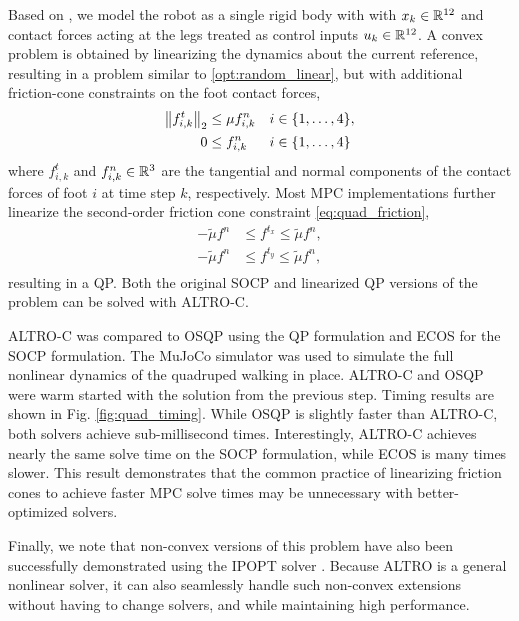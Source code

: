 \documentclass[../root.tex]{subfiles}
\begin{document}
Based on \cite{carlo_Dynamic_2018}, we model the robot as a single rigid body with
with $x_k \in \mathbb{R}^{12}$ and contact forces acting at the legs treated as
control inputs $u_k \in \mathbb{R}^{12}$.
A convex problem is obtained by linearizing the dynamics about the current
reference, resulting in a problem similar to \eqref{opt:random_linear}, but
with additional friction-cone constraints on the foot contact forces,
\begin{subequations}
\begin{align}
    \norm{f_{i,k}^t}_2 &\leq \mu f_{i,k}^n  && i \in \{1,\hdots,4\} ,\label{eq:quad_friction} \\
    0 &\leq f_{i,k}^n && i \in \{1, \hdots, 4\}
\end{align}
\end{subequations}
where $f_{i,k}^t$ and $f_{i,k}^n \in \mathbb{R}^{3}$ are the tangential and normal
components of the contact forces of foot $i$ at time step $k$, respectively.
Most MPC implementations further linearize the second-order friction cone
constraint \eqref{eq:quad_friction},
\begin{equation}
\begin{aligned}
    -\tilde{\mu} f^{n} &\leq f^{t_x} \leq \tilde{\mu} f^{n} ,\\ 
    -\tilde{\mu} f^{n} &\leq f^{t_y} \leq \tilde{\mu} f^{n} ,\\ 
\end{aligned}
\end{equation}
resulting in a QP. Both the original SOCP and linearized QP versions of the
problem can be solved with ALTRO-C.

ALTRO-C was compared to OSQP using the QP formulation and ECOS for the SOCP
formulation. The MuJoCo simulator \cite{todorov_MuJoCo_2012} was used to
simulate the full nonlinear dynamics of the quadruped walking in place.
ALTRO-C and OSQP were warm started with the solution from the previous step.
Timing results are shown in Fig. \ref{fig:quad_timing}. While OSQP is
slightly faster than ALTRO-C, both solvers achieve sub-millisecond times.
Interestingly, ALTRO-C achieves nearly the same solve time on the SOCP
formulation, while ECOS is many times slower. This result demonstrates that
the common practice of linearizing friction cones to achieve faster MPC solve
times may be unnecessary with better-optimized solvers.

Finally, we note that non-convex versions of this problem have also been
successfully demonstrated using the IPOPT solver
\cite{bledt_Implementing_2019}. Because ALTRO is a general nonlinear solver,
it can also seamlessly handle such non-convex extensions without having to
change solvers, and while maintaining high performance.
\end{document}
